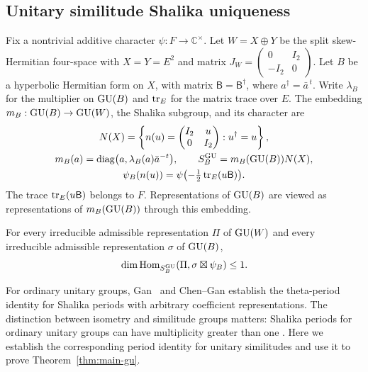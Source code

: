 \subsection{Unitary similitude Shalika uniqueness}
Fix a nontrivial additive character $\psi:F\to\mathbb C^\times$.
Let $W=X\oplus Y$ be the split skew-Hermitian four-space with
$X=Y=E^2$ and matrix
$J_W=\left(\begin{smallmatrix}0&I_2\\-I_2&0\end{smallmatrix}\right)$.
Let $B$ be a hyperbolic Hermitian form on $X$, with matrix
$\mathsf B=\mathsf B^\dagger$, where $a^\dagger=\bar a^{\,t}$.
Write $\lambda_B$ for the multiplier on $\operatorname{GU}(B)$ and $\operatorname{tr}_E$ for
the matrix trace over $E$. The embedding $m_B:\operatorname{GU}(B)\to\operatorname{GU}(W)$,
the Shalika subgroup, and its character are
\begin{equation}\label{eq:intro-shalika}
 \begin{gathered}
 N(X)=\left\{n(u)=\begin{pmatrix}I_2&u\\0&I_2\end{pmatrix}:
                                    u^\dagger=u\right\},\\
 m_B(a)=\operatorname{diag}\bigl(a,\lambda_B(a)\bar a^{-t}\bigr),\qquad
 S_B^{\operatorname{GU}}=m_B(\operatorname{GU}(B))N(X),\\
 \psi_B(n(u))=\psi\bigl(-\tfrac12\operatorname{tr}_E(u\mathsf B)\bigr).
 \end{gathered}
\end{equation}
The trace $\operatorname{tr}_E(u\mathsf B)$ belongs to $F$. Representations of
$\operatorname{GU}(B)$ are viewed as representations of $m_B(\operatorname{GU}(B))$ through
this embedding.
\begin{mainthm}\label{thm:main-gu}\label{gu:thm:main}
For every irreducible admissible representation $\Pi$ of $\operatorname{GU}(W)$
and every irreducible admissible representation $\sigma$ of $\operatorname{GU}(B)$,
\begin{equation}\label{gu:eq:main}
 \dim\operatorname{Hom}_{S_B^{\operatorname{GU}}}(\Pi,\sigma\boxtimes\psi_B)\leq1.
\end{equation}
\end{mainthm}

For ordinary unitary groups, Gan~\cite{GanPeriods} and Chen--Gan
\cite[Proposition~3.4 and Theorem~3.5]{ChenGan} establish the theta-period
identity for Shalika periods with arbitrary coefficient representations. The distinction between
isometry and similitude groups matters: Shalika periods for ordinary unitary groups can have multiplicity greater than one
\cite[Theorem~4.3]{ChenGan}. Here we establish the corresponding period identity
for unitary similitudes and use it to prove Theorem~\ref{thm:main-gu}.

